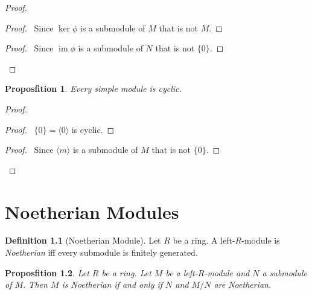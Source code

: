 \documentclass{book}
\let\qed\relax
\newtheorem{prop}{Proposfition}[chapter]
\theoremstyle{definition}
\newtheorem{df}[prop]{Definition}
\newcommand{\im}{\ensuremath{\operatorname{im}}}
\begin{document}
\begin{proof}
\pf
{}
\begin{proof}
	\pf\ Since $\ker \phi$ is a submodule of $M$ that is not $M$.
\end{proof}
\step{4}{$\im \phi = N$}
\begin{proof}
	\pf\ Since $\im \phi$ is a submodule of $N$ that is not $\{0\}$.
\end{proof}
\qed
\end{proof}

\begin{prop}
Every simple module is cyclic.
\end{prop}

\begin{proof}
\pf
{}
\begin{proof}
	\pf\ $\{0\} = \langle 0 \rangle$ is cyclic.
\end{proof}
\begin{proof}
	\pf\ Since $\langle m \rangle$ is a submodule of $M$ that is not $\{0\}$.
\end{proof}
\qed
\end{proof}

\chapter{Noetherian Modules}

\begin{df}[Noetherian Module]
Let $R$ be a ring. A left-$R$-module is \emph{Noetherian} iff every submodule is finitely generated.
\end{df}

\begin{prop}
Let $R$ be a ring. Let $M$ be a left-$R$-module and $N$ a submodule of $M$. Then $M$ is Noetherian if and only if $N$ and $M/N$ are Noetherian.
\end{prop}
\end{document}
